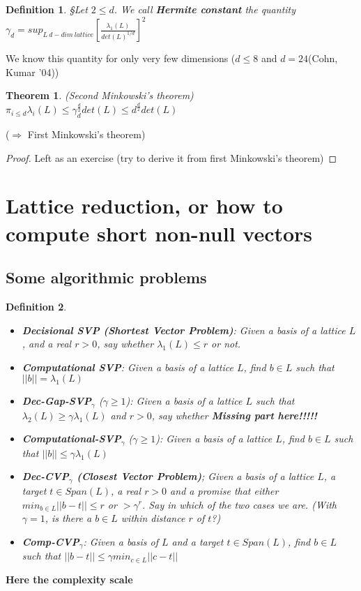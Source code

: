 \documentclass[a4paper,10pt]{article}
\newtheorem{definition}{Definition}
\newtheorem{theorem}{Theorem}
\begin{document}
\begin{definition}
§Let $2 \leq d$. We call \textbf{Hermite constant} the quantity $\gamma_d = sup_{L \ d-dim \ lattice} [\frac{\lambda_1 (L)}{det(L)^{1/d}}]^2$
\end{definition}

We know this quantity for only very few dimensions ($d \leq 8$ and $d=24$(Cohn, Kumar '04))

\begin{theorem} (Second Minkowski's theorem)
$\pi_{i \leq d} \lambda_i(L) \leq \gamma_d^{\frac{d}{2}} det(L) \leq d^{\frac{d}{2}} det(L)$
\end{theorem}

($\Rightarrow$ First Minkowski's theorem)

\begin{proof}
Left as an exercise (try to derive it from first Minkowski's theorem)
\end{proof}

\section{Lattice reduction, or how to compute short non-null vectors}

\subsection{Some algorithmic problems}

\begin{definition}
\begin{itemize}
\item \textbf{Decisional SVP (Shortest Vector Problem)}: Given a basis of a lattice $L$, and a real $r>0$, say whether $\lambda_1(L) \leq r$ or not.
\item \textbf{Computational SVP}: Given a basis of a lattice $L$, find $b \in L$ such that $||b||=\lambda_1(L)$
\item \textbf{Dec-Gap-SVP$_{\gamma}$} ($\gamma \geq 1$): Given a basis of a lattice $L$ such that $\lambda_2(L) \geq \gamma \lambda_1(L)$ and $r>0$, say whether \textbf{Missing part here!!!!!}
\item \textbf{Computational-SVP$_{\gamma}$} ($\gamma \geq 1$): Given a basis of a lattice $L$, find $b \in L$ such that $||b|| \leq \gamma \lambda_1(L)$
\item \textbf{Dec-CVP$_{\gamma}$ (Closest Vector Problem)}; Given a basis of a lattice $L$, a target $t \in Span(L)$, a real $r>0$ and a promise that either $min_{b \in L} ||b-t|| \leq r$ or $> \gamma^r$. Say in which of the two cases we are. (With $\gamma = 1$, is there a $b \in L$ within distance $r$ of $t$?)
\item \textbf{Comp-CVP$_{\gamma}$}: Given a basis of $L$ and a target $t \in Span(L)$, find $b \in L$ such that $||b-t|| \leq \gamma min_{c \in L} ||c-t||$
\end{itemize}
\end{definition}
\textbf{Here the complexity scale}
\end{document}
